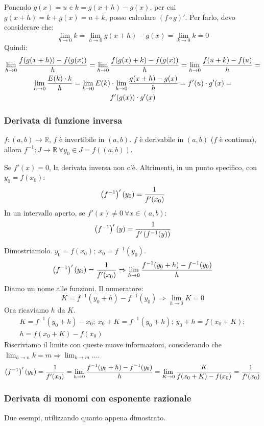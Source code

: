 \documentclass[12pt,a4paper]{article}
\begin{document}
Ponendo $g(x) = u$ e $k = g(x+h) - g(x)$, per cui $g(x+h) = k+g(x) = u + k$,
posso calcolare $ \left( f \circ g \right)' $.
Per farlo, devo considerare che:
\[ \lim_{h \to 0} k = \lim_{h \to 0} g(x +h) - g(x) = \lim_{k \to 0} k = 0 \]
Quindi:
\begin{multline}
\lim_{h \to 0} {f(g(x+h)) - f(g(x)) \over h} = \lim_{h \to 0} {f(g(x) + k) 
- f(g(x)) \over h} = \lim_{h \to 0} {f(u + k) - f(u) \over h} = \\
\lim_{h \to 0} { E(k) \cdot k \over h} = 
\lim_{k \to 0} E(k) \cdot \lim_{h \to 0} { g(x+h) - g(x) \over h } =
 f'(u) \cdot g'(x) = \\ f'(g(x)) \cdot g'(x)
\end{multline}

\subsubsection{Derivata di funzione inversa}
$f: (a,b) \to \mathbb{R}$, $f$ \`e invertibile in $(a,b)$. $f$ \`e
derivabile in $(a,b)$ ($f$ \`e continua), allora $f^{-1}: J \to \mathbb{R}
\ \forall y_0 \in J = f\left( (a,b) \right)$.

Se $f'(x) = 0$, la derivata inversa non c'\`e. Altrimenti, in un punto
specifico, con $ y_0 = f(x_0)$:
$$ \left( f^{-1} \right)'(y_0) = {1 \over f'(x_0)} $$
In un intervallo aperto, se $f'(x) \neq 0 \ \forall x \in (a,b)$:
$$ \left( f^{-1} \right)'(y) = { 1 \over f'\left(f^{-1}(y)\right) } $$

Dimostriamolo. $ y_0 = f(x_0) ; \ x_0 = f^{-1}(y_0) $.
$$ \left( f^{-1} \right)'(y_0) = {1 \over f'(x_0)} \Rightarrow
\lim_{h \to 0} { f^{-1}(y_0+h) - f^{-1} (y_0) \over h} $$
Diamo un nome alle funzioni. Il numeratore:
$$ K = f^{-1}(y_0 +h) - f^{-1}(y_0) \Rightarrow \lim_{h \to 0} K = 0 $$
Ora ricaviamo $h$ da $K$.
\begin{multline*}
K = f^{-1}(y_0 + h) - x_0 ; \ x_0 + K = f^{-1}(y_0 +h) ; \ 
y_0 + h = f(x_0 + K); \\ h = f(x_0 + K) - f(x_0)
\end{multline*}
Riscriviamo il limite con queste nuove informazioni, considerando che
$ \lim_{h \to n} k = m \Rightarrow \lim_{k \to m} \dots$.
\begin{equation}
\left( f^{-1} \right)'(y_0) = {1 \over f'(x_0)} =
\lim_{h \to 0} { f^{-1}(y_0+h) - f^{-1} (y_0) \over h} =
\lim_{K \to 0} { K \over f(x_0 + K) - f(x_0)} = 
{1 \over f'(x_0)}
\end{equation}

\subsubsection{Derivata di monomi con esponente razionale}
Due esempi, utilizzando quanto appena dimostrato.
\end{document}
